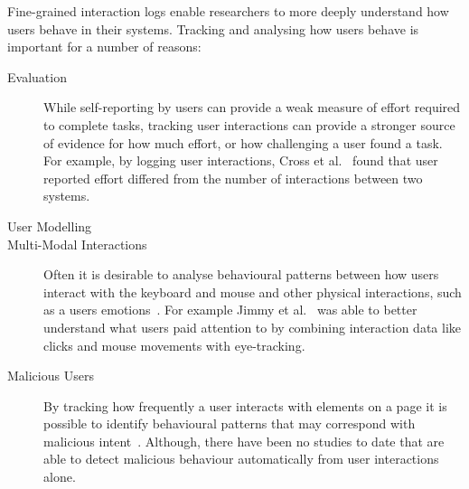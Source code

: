 
Fine-grained interaction logs enable researchers to more deeply understand how users behave in their systems. Tracking and analysing how users behave is important for a number of reasons:

\begin{description}
	\item[Evaluation] While self-reporting by users can provide a weak measure of effort required to complete tasks, tracking user interactions can provide a stronger source of evidence for how much effort, or how challenging a user found a task. For example, by logging user interactions, Cross et al.~\cite{cross2021search} found that user reported effort differed from the number of interactions between two systems.
	\item[User Modelling] 
	\item[Multi-Modal Interactions] Often it is desirable to analyse behavioural patterns between how users interact with the keyboard and mouse and other physical interactions, such as a users emotions~\cite{arapakis2008affective}. For example Jimmy et al.~\cite{jimmy2020health} was able to better understand what users paid attention to by combining interaction data like clicks and mouse movements with eye-tracking.
	\item[Malicious Users] By tracking how frequently a user interacts with elements on a page it is possible to identify behavioural patterns that may correspond with malicious intent~\cite{gadiraju2015understanding}. Although, there have been no studies to date that are able to detect malicious behaviour automatically from user interactions alone.
\end{description}